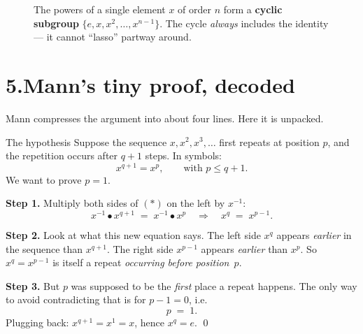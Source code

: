 \documentclass[11pt]{article}
\begin{document}
\begin{figure}[H]
\centering
{}
\caption{The powers of a single element $x$ of order $n$ form a
\textbf{cyclic subgroup} $\{e, x, x^2, \ldots, x^{n-1}\}$. The cycle
\emph{always} includes the identity --- it cannot ``lasso'' partway
around.}
\end{figure}

\section*{5.\quad Mann's tiny proof, decoded}

Mann compresses the argument into about four lines. Here it is unpacked.

\begin{watchbox}{The hypothesis}
Suppose the sequence $x, x^2, x^3, \ldots$ first repeats at position $p$,
and the repetition occurs after $q+1$ steps. In symbols:
\[
  x^{q+1} = x^p, \qquad \text{with } p \leq q+1. \tag{$\ast$}
\]
We want to prove $p = 1$.
\end{watchbox}

\noindent\textbf{Step 1.} Multiply both sides of $(\ast)$ on the left by
$x^{-1}$:
\[
  x^{-1} \bullet x^{q+1} \;=\; x^{-1} \bullet x^p
  \quad\Longrightarrow\quad
  x^{q} \;=\; x^{p-1}.
\]

\noindent\textbf{Step 2.} Look at what this new equation says. The left
side $x^q$ appears \emph{earlier} in the sequence than $x^{q+1}$. The right
side $x^{p-1}$ appears \emph{earlier} than $x^p$. So $x^q = x^{p-1}$ is
itself a repeat \emph{occurring before position~$p$}.

\noindent\textbf{Step 3.} But $p$ was supposed to be the \emph{first}
place a repeat happens. The only way to avoid contradicting that is for
$p-1 = 0$, i.e.\
\[
  \boxed{\;p \;=\; 1.\;}
\]
Plugging back: $x^{q+1} = x^1 = x$, hence $x^q = e$. \qed
\end{document}
